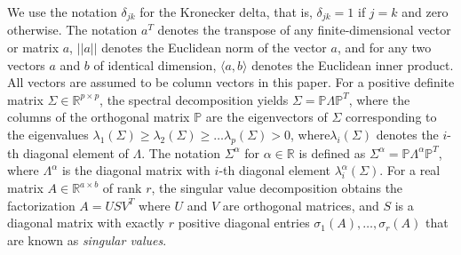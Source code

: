 \documentclass[ss]{imsart}
\newcommand{\BP}{{\mathbb{P}}}
\newcommand{\BR}{{\mathbb{R}}}
\theoremstyle{Example}
\begin{document}
We use the notation $\delta_{j k}$ for the Kronecker delta, that is, $\delta_{j k} = 1$ if $j = k$ and zero otherwise. The notation $a^{T}$ denotes the transpose of any finite-dimensional vector or matrix $a$,  $|| a ||$ denotes the Euclidean norm of the vector $a$, and for any two vectors $a$ and $b$ of identical dimension,  $\langle a, b \rangle $ denotes the Euclidean inner product. All vectors are assumed to be column vectors in this paper. For a positive definite matrix $\Sigma \in \BR^{p \times p}$, the spectral decomposition yields $\Sigma = \BP \Lambda \BP^{T}$, where the columns of the orthogonal matrix $\BP$ are the eigenvectors of $\Sigma$ corresponding to the eigenvalues $\lambda_{1} (\Sigma) \geq \lambda_{2} (\Sigma) \geq \ldots \lambda_{p} (\Sigma) > 0$, where$\lambda_{i} (\Sigma)$ denotes the $i$-th diagonal element of $\Lambda$. The notation $\Sigma^{\alpha}$ for $\alpha \in \BR$ is defined as $\Sigma^{\alpha} = \BP \Lambda^{\alpha} \BP^{T}$, where  $\Lambda^{\alpha}$ is the diagonal matrix with $i$-th diagonal element $\lambda_{i}^{\alpha} (\Sigma)$. For a real matrix $A \in \BR^{a \times b}$ of rank $r$, the singular value decomposition obtains the factorization $A = U S V^{T}$ where $U$ and $V$ are orthogonal matrices, and $S$ is a diagonal matrix with exactly $r$ positive diagonal entries $\sigma_{1} (A), \ldots, \sigma_{r} (A)$ that are known as \textit{singular values}. 
\end{document}
